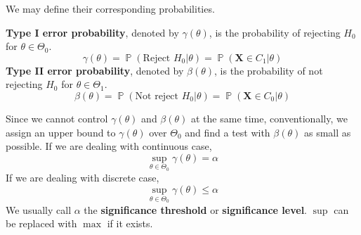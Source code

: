 \documentclass{huhtakm-template-book-v2}
\DeclareMathOperator{\prob}{\mathbb{P}}
\begin{document}
\newpage
We may define their corresponding probabilities.
\begin{defn}
	\textbf{Type I error probability}, denoted by $\gamma(\theta)$, is the probability of rejecting $H_{0}$ for $\theta\in\Theta_{0}$.
	\begin{equation*}
		\gamma(\theta)=\prob(\text{Reject }H_{0}|\theta)=\prob(\mathbf{X}\in C_{1}|\theta)
	\end{equation*}
	\textbf{Type II error probability}, denoted by $\beta(\theta)$, is the probability of not rejecting $H_{0}$ for $\theta\in\Theta_{1}$.
	\begin{equation*}
		\beta(\theta)=\prob(\text{Not reject }H_{0}|\theta)=\prob(\mathbf{X}\in C_{0}|\theta)
	\end{equation*}
\end{defn}
\begin{rem}
	Since we cannot control $\gamma(\theta)$ and $\beta(\theta)$ at the same time, conventionally, we assign an upper bound to $\gamma(\theta)$ over $\Theta_{0}$ and find a test with $\beta(\theta)$ as small as possible. If we are dealing with continuous case,
	\begin{equation*}
		\sup_{\theta\in\Theta_{0}}\gamma(\theta)=\alpha
	\end{equation*}
	If we are dealing with discrete case,
	\begin{equation*}
		\sup_{\theta\in\Theta_{0}}\gamma(\theta)\leq\alpha
	\end{equation*}
	We usually call $\alpha$ the \textbf{significance threshold} or \textbf{significance level}. $\sup$ can be replaced with $\max$ if it exists.
\end{rem}
\end{document}
